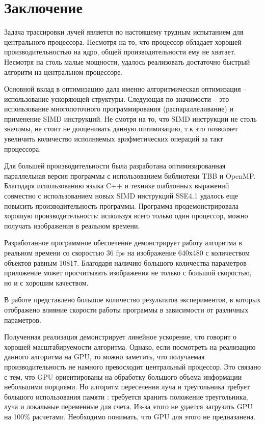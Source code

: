 \documentclass[12pt, a4paper, utf8]{article}
\begin{document}


\newpage
\section*{Заключение}
Задача трассировки лучей является по настоящему трудным испытанием для центрального процессора. Несмотря на то, что процессор обладает хорошей производительностью на ядро, общей производительности ему не хватает. Несмотря на столь малые мощности, удалось реализовать достаточно быстрый алгоритм на центральном процессоре. 

Основной вклад в оптимизацию дала именно алгоритмическая оптимизация -- использование ускоряющей структуры. Следующая по значимости -- это использование многопоточного программирования (распараллеливание) и применение SIMD инструкций. Не смотря на то, что SIMD инструкции не столь значимы, не стоит не дооценивать данную оптимизацию, т.к это позволяет увеличить количество исполняемых арифметических операций за такт процессора.

Для большей производительности была разработана оптимизированная параллельная версия программы с использованием библиотеки TBB и OpenMP. Благодаря использованию языка C++ и технике шаблонных выражений совместно с использованием новых SIMD инструкций SSE4.1 удалось еще повысить производительность программы. Программа продемонстрировала хорошую производительность: используя всего только один процессор, можно получать изображения в реальном времени. 

Разработанное программное обеспечение демонстрирует работу алгоритма в реальном времени со скоростью 36 fps на изображение 640х480 с количеством объектов равным 10817. Благодаря наличию большого количества параметров приложение может просчитывать изображения не только с большой скоростью, но и с хорошим качеством. 

В работе представлено большое количество результатов экспериментов, в которых отображено влияние скорости работы программы в зависимости от различных параметров. 

Полученная реализация демонстрирует линейное ускорение, что говорит о хорошей масштабируемости алгоритма. Однако, если посмотреть на реализацию данного алгоритма на GPU, то можно заметить, что получаемая производительность не намного превосходит центральный процессор. Это связано с тем, что GPU ориентированы на обработку большого объема информации небольшими порциями. Но алгоритм пересечения луча и треугольника требует большого использования памяти : требуется хранить положение треугольника, луча и локальные переменные для счета. Из-за этого не удается загрузить GPU на 100\% расчетами. Необходимо понимать, что GPU для этого не предназанена.
\end{document}
